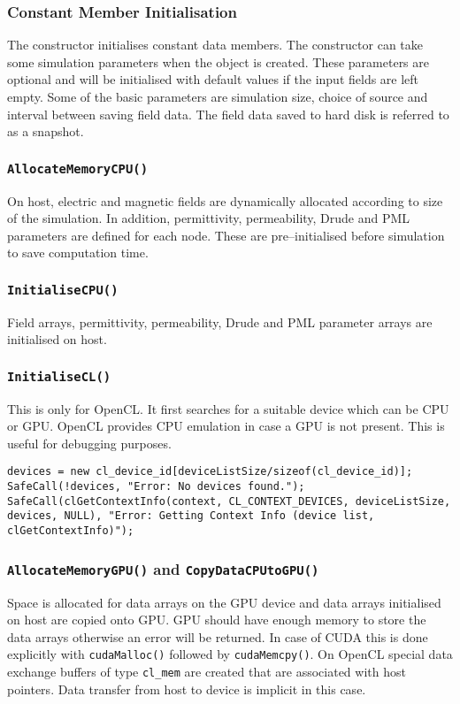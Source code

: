 \subsubsection{Constant Member Initialisation}
The constructor initialises constant data members. The constructor can take some simulation parameters when the object is created. These parameters are optional and will be initialised with default values if the input fields are left empty. Some of the  basic parameters are simulation size, choice of source and interval between saving field data. The field data saved to hard disk is referred to as a snapshot.
\subsubsection{\texttt{AllocateMemoryCPU()}}
On host, electric and magnetic fields are dynamically allocated according to size of the simulation. In addition, permittivity, permeability, Drude and PML parameters are defined for each node. These are pre--initialised before simulation to save computation time.
\subsubsection{\texttt{InitialiseCPU()}}
Field arrays, permittivity, permeability, Drude and PML parameter arrays are initialised on host.
\subsubsection{\texttt{InitialiseCL()}}
This is only for OpenCL. It first searches for a suitable device which can be CPU or GPU. OpenCL provides CPU emulation in case a GPU is not present. This is useful for debugging purposes.

\label{lst:OpenCL-Device-Search}
\SingleSpacing
\begin{lstlisting}[caption={Device selection in OpenCL}]
devices = new cl_device_id[deviceListSize/sizeof(cl_device_id)];
SafeCall(!devices, "Error: No devices found.");
SafeCall(clGetContextInfo(context, CL_CONTEXT_DEVICES, deviceListSize, devices, NULL), "Error: Getting Context Info (device list, clGetContextInfo)");
\end{lstlisting}
\DoubleSpacing
\subsubsection{\texttt{AllocateMemoryGPU()} and \texttt{CopyDataCPUtoGPU()}}
Space is allocated for data arrays on the GPU device and data arrays initialised on host are copied onto GPU. GPU should have enough memory to store the data arrays otherwise an error will be returned. In case of CUDA this is done explicitly with \texttt{cudaMalloc()} followed by \texttt{cudaMemcpy()}. On OpenCL special data exchange buffers of type \verb|cl_mem| are created that are associated with host pointers. Data transfer from host to device is implicit in this case.

